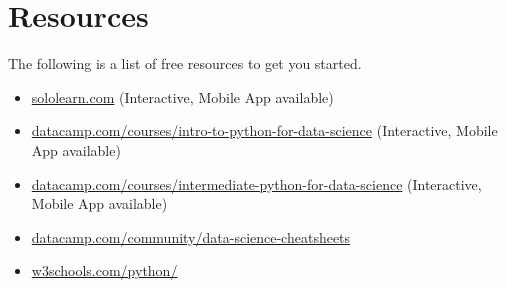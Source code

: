 \section{Resources}
    The following is a list of free resources to get you started.

    \begin{itemize}
        \small
        \item \href{https://sololearn.com}
        {sololearn.com} 
        (Interactive, Mobile App available)
        \item \href{https://www.datacamp.com/courses/intro-to-python-for-data-science}
        {datacamp.com/courses/intro-to-python-for-data-science}
        (Interactive, Mobile App available)
        \item \href{https://www.datacamp.com/courses/intermediate-python-for-data-science}
        {datacamp.com/courses/intermediate-python-for-data-science}
        (Interactive, Mobile App available)
        \item \href{https://www.datacamp.com/community/data-science-cheatsheets}
        {datacamp.com/community/data-science-cheatsheets}
        \item \href{https://www.w3schools.com/python/}
        {w3schools.com/python/}
    \end{itemize}

